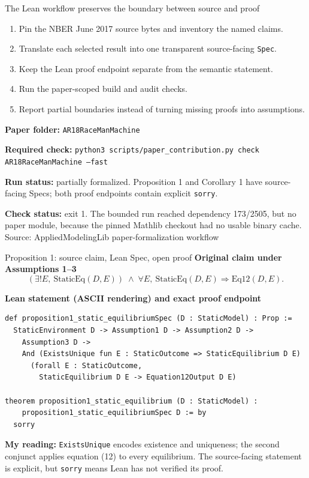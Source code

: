\documentclass[aspectratio=169,11pt]{beamer}
\newcommand{\source}[1]{\vfill{\tiny\color{muted}Source: #1}}
\begin{document}
\begin{frame}{The Lean workflow preserves the boundary between source and proof}
  \begin{enumerate}
    \item Pin the NBER June 2017 source bytes and inventory the named claims.
    \item Translate each selected result into one transparent source-facing \texttt{Spec}.
    \item Keep the Lean proof endpoint separate from the semantic statement.
    \item Run the paper-scoped build and audit checks.
    \item Report partial boundaries instead of turning missing proofs into assumptions.
  \end{enumerate}

  \medskip
  \textbf{Paper folder:} \texttt{AR18RaceManMachine}

  \textbf{Required check:} \texttt{python3 scripts/paper\_contribution.py check AR18RaceManMachine --fast}

  \medskip
  \textbf{Run status:} partially formalized. Proposition 1 and Corollary 1 have
  source-facing Specs; both proof endpoints contain explicit \texttt{sorry}.

  \textbf{Check status:} exit 1. The bounded run reached dependency 173/2505,
  but no paper module, because the pinned Mathlib checkout had no usable binary cache.
  \source{AppliedModelingLib paper-formalization workflow}
\end{frame}

\begin{frame}[fragile]{Proposition 1: source claim, Lean Spec, open proof}
  \textbf{Original claim under Assumptions 1--3}
  \[
    (\exists! E,\ \mathrm{StaticEq}(D,E))
    \;\land\;
    \forall E,\ \mathrm{StaticEq}(D,E)\Rightarrow \mathrm{Eq12}(D,E).
  \]

  \textbf{Lean statement (ASCII rendering) and exact proof endpoint}
  \begin{lstlisting}
def proposition1_static_equilibriumSpec (D : StaticModel) : Prop :=
  StaticEnvironment D -> Assumption1 D -> Assumption2 D ->
    Assumption3 D ->
    And (ExistsUnique fun E : StaticOutcome => StaticEquilibrium D E)
      (forall E : StaticOutcome,
        StaticEquilibrium D E -> Equation12Output D E)

theorem proposition1_static_equilibrium (D : StaticModel) :
    proposition1_static_equilibriumSpec D := by
  sorry
  \end{lstlisting}

  \textbf{My reading:} \texttt{ExistsUnique} encodes existence and uniqueness;
  the second conjunct applies equation (12) to every equilibrium. The source-facing
  statement is explicit, but \texttt{sorry} means Lean has not verified its proof.
\end{frame}
\end{document}
